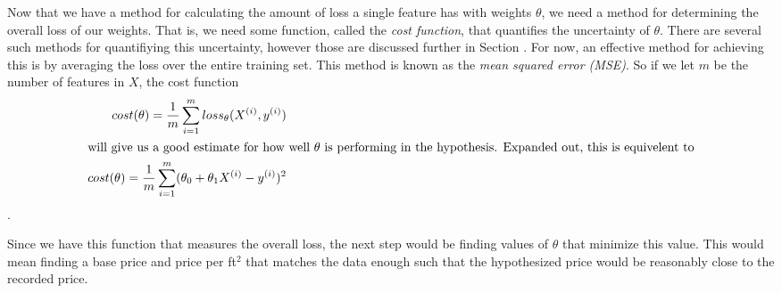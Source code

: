 Now that we have a method for calculating the amount of loss a single feature
has with weights $\theta$, we need a method for determining the overall loss of
our weights. That is, we need some function, called the \emph{cost function},
that quantifies the uncertainty of $\theta$. There are several such methods for
quantifiying this uncertainty, however those are discussed further in Section
\placeholder. For now, an effective method for achieving this is by averaging
the loss over the entire training set. This method is known as the \emph{mean
squared error (MSE)}. So if we let $m$ be the number of features in $X$, the
cost function
\begin{subequations}
    \begin{align}
        cost(\theta) = \frac{1}{m}\sum_{i=1}^m loss_{\theta}(X^{(i)}, y^{(i)}) \\
    \intertext{will give us a good estimate for how well $\theta$ is performing
        in the hypothesis. Expanded out, this is equivelent to}
        cost(\theta) = \frac{1}{m}\sum_{i=1}^m (\theta_0 + \theta_1X^{(i)} -
        y^{(i)})^2
    \end{align}
\end{subequations}
.

Since we have this function that measures the overall loss, the next step
would be finding values of $\theta$ that minimize this value. This would mean
finding a base price and price per ft$^2$ that matches the data enough such that
the hypothesized price would be reasonably close to the recorded price.

